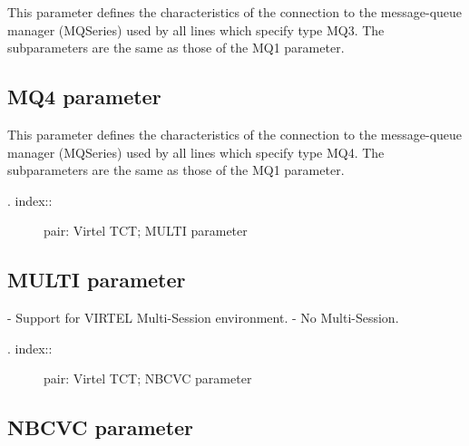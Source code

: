 \documentclass[letterpaper,10pt,english]{sphinxmanual}
\begin{document}
This parameter defines the characteristics of the connection to the message-queue manager (MQSeries) used by all lines which specify type MQ3. The subparameters are the same as those of the MQ1 parameter.


\subsection{MQ4 parameter}
\label{\detokenize{Installation_Guide:mq4-parameter}}
\begin{sphinxVerbatim}[commandchars=\\\{\}]
\PYG{p}{[}\PYG{p}{]}    
\end{sphinxVerbatim}

This parameter defines the characteristics of the connection to the message-queue manager (MQSeries) used by all lines which specify type MQ4. The subparameters are the same as those of the MQ1 parameter.
\begin{description}
\item[{. index::}] \leavevmode
pair: Virtel TCT; MULTI parameter

\end{description}


\subsection{MULTI parameter}
\label{\detokenize{Installation_Guide:multi-parameter}}
\begin{sphinxVerbatim}[commandchars=\\\{\}]
 
\end{sphinxVerbatim}

 - Support for VIRTEL Multi-Session environment.
 - No Multi-Session.
\begin{description}
\item[{. index::}] \leavevmode
pair: Virtel TCT; NBCVC parameter

\end{description}


\subsection{NBCVC parameter}
\label{\detokenize{Installation_Guide:nbcvc-parameter}}
\begin{sphinxVerbatim}[commandchars=\\\{\}]
 
\end{sphinxVerbatim}
\end{document}
